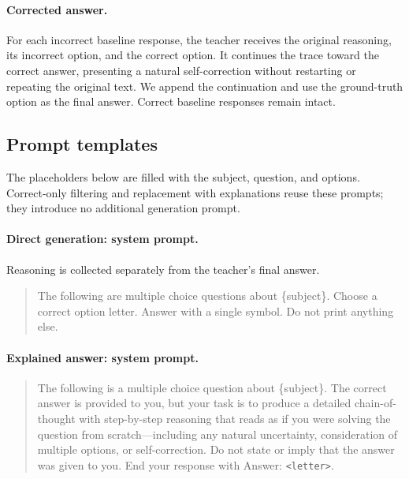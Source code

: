 \documentclass[11pt]{article}
\begin{document}
\paragraph{Corrected answer.}
For each incorrect baseline response, the teacher receives the original reasoning, its incorrect option, and the correct option. It continues the trace toward the correct answer, presenting a natural self-correction without restarting or repeating the original text. We append the continuation and use the ground-truth option as the final answer. Correct baseline responses remain intact.

\subsection{Prompt templates}
The placeholders below are filled with the subject, question, and options. Correct-only filtering and replacement with explanations reuse these prompts; they introduce no additional generation prompt.

\paragraph{Direct generation: system prompt.}
Reasoning is collected separately from the teacher's final answer.
\begin{quote}\small
  The following are multiple choice questions about \{subject\}. Choose a correct option letter. Answer with a single symbol. Do not print anything else.
\end{quote}

\paragraph{Explained answer: system prompt.}
\begin{quote}\small
  The following is a multiple choice question about \{subject\}. The correct answer is provided to you, but your task is to produce a detailed chain-of-thought with step-by-step reasoning that reads as if you were solving the question from scratch---including any natural uncertainty, consideration of multiple options, or self-correction. Do not state or imply that the answer was given to you. End your response with Answer: \texttt{<letter>}.
\end{quote}
\end{document}
